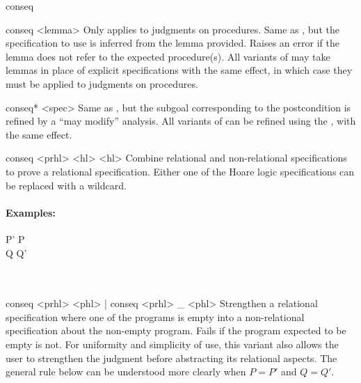 \begin{tactic}{conseq}
  \begin{tsyntax}{conseq <lemma>}
  Only applies to judgments on procedures. Same as , but the specification to use is inferred from
  the lemma provided. Raises an error if the lemma does not refer to
  the expected procedure(s). All variants of  may take
  lemmas in place of explicit specifications with the same effect, in
  which case they must be applied to judgments on procedures.
  \end{tsyntax}

  \begin{tsyntax}{conseq* <spec>}
  Same as , but the subgoal corresponding to the
  postcondition is refined by a ``may modify'' analysis. All variants
  of  can be refined using the \ec{*}, with the same
  effect.
  \end{tsyntax}

  \begin{tsyntax}{conseq <prhl> <hl> <hl>}
  Combine relational and non-relational specifications to prove a
  relational specification. Either one of the Hoare logic
  specifications can be replaced with a wildcard.

  \paragraph{Examples:}\strut

  \begin{cmathpar}
    {P' \Rightarrow P \wedge {} \wedge {} \\
     Q \wedge {} \wedge {} \Rightarrow Q' \\
      \\
      \\
     }
    {}
  \end{cmathpar}
  \end{tsyntax}

  \begin{tsyntax}{conseq <prhl> <phl> | conseq <prhl> _ <phl>}
  Strengthen a relational specification where one of the programs is
  empty into a non-relational specification about the non-empty
  program. Fails if the program expected to be empty is not. For
  uniformity and simplicity of use, this variant also allows the user
  to strengthen the \prhl judgment before abstracting its relational
  aspects. The general rule below can be understood more clearly when
  $P = P'$ and $Q = Q'$.


\end{tsyntax}
\end{tactic}
